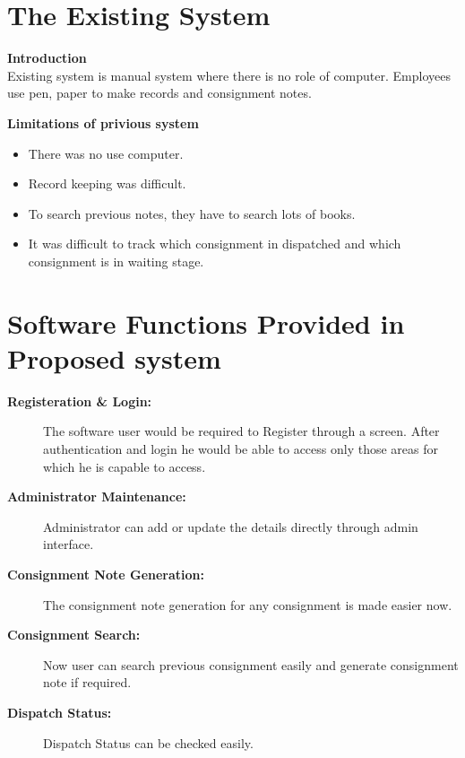 \section{The Existing System}
{\bf Introduction }\\
Existing system is manual system where there is no role of computer. 
Employees use pen, paper to make records and consignment notes.

{\bf {Limitations of privious system }}
\begin{itemize}
\item There was no use computer.

\item Record keeping was difficult.

\item To search previous notes, they have to search lots of books.

\item It was difficult to track which consignment in dispatched and
which consignment is in waiting stage.

\end{itemize}


\section{Software Functions Provided in Proposed system}

\begin{description}
\item[\bf{Registeration \& Login}:]
The software user would be required to Register through a screen. After 
authentication and login he would be able to access only those areas 
for which he is capable to access.
\item[\bf{Administrator Maintenance}:]
Administrator can add or update the details directly through admin 
interface.
\item[\bf{Consignment Note Generation}:]
The consignment note generation for any consignment is made easier now.
\item[\bf{Consignment Search}:]
Now user can search previous consignment easily and generate consignment 
note if required.
\item[\bf{Dispatch Status}:]
Dispatch Status can be checked easily. 
\end{description}

